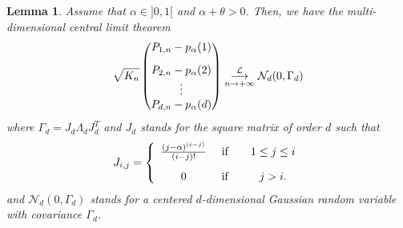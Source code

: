 \documentclass[twoside,12pt]{article}
\newcommand{\cL}{\mathcal{L}}
\newcommand{\cN}{\mathcal{N}}
\newtheorem{lem}[thm]{Lemma}
\begin{document}
\begin{lem}
\label{L-MATRIXCLTEP}
Assume that $\alpha\in]0,1[$ and $\alpha+\theta>0$. Then, we have 
the multi-dimensional central limit theorem
\begin{equation}
\label{MCLTEP}
\sqrt{K_{n}} 
\begin{pmatrix}
P_{1,n} -p_{\alpha}(1) \vspace{2ex}\\
P_{2,n} - p_{\alpha}(2) \\
\vdots\\
P_{d,n} - p_{\alpha}(d)
\end{pmatrix}
\underset{n\rightarrow+\infty}{\overset{\cL}{\longrightarrow}} \cN_d(0, \Gamma_d)
\end{equation}
where $\Gamma_d=J_d \Lambda_d J_d^T$ and $J_d$ stands for the square matrix of order $d$ such that
\begin{equation}
\label{Jij}
J_{i,j}=\left \{ \begin{array}{ccc}
    \frac{(j-\alpha)^{(i-j)}}{(i-j)!}  & \text{ if } & \ \ 1 \leq j \leq i \vspace{2ex}\\
     0 & \text{ if }  & \ \ j>i.
   \end{array}  \right.
\end{equation}
and $ \cN_d(0, \Gamma_d)$ stands for a centered $d$-dimensional Gaussian random variable with covariance $\Gamma_d$.
\end{lem}
\end{document}
